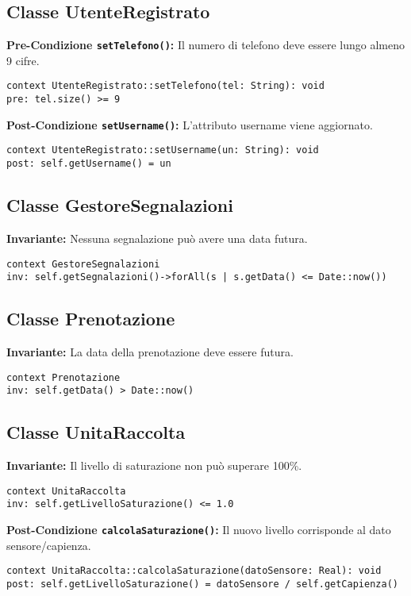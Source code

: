 \subsection{Classe UtenteRegistrato}

\textbf{Pre-Condizione \texttt{setTelefono()}:} Il numero di telefono deve essere lungo almeno 9 cifre.
\begin{lstlisting}[language=OCL]
context UtenteRegistrato::setTelefono(tel: String): void
pre: tel.size() >= 9
\end{lstlisting}

\textbf{Post-Condizione \texttt{setUsername()}:} L’attributo username viene aggiornato.
\begin{lstlisting}[language=OCL]
context UtenteRegistrato::setUsername(un: String): void
post: self.getUsername() = un
\end{lstlisting}

\subsection{Classe GestoreSegnalazioni}

\textbf{Invariante:} Nessuna segnalazione può avere una data futura.
\begin{lstlisting}[language=OCL]
context GestoreSegnalazioni
inv: self.getSegnalazioni()->forAll(s | s.getData() <= Date::now())
\end{lstlisting}

\subsection{Classe Prenotazione}

\textbf{Invariante:} La data della prenotazione deve essere futura.
\begin{lstlisting}[language=OCL]
context Prenotazione
inv: self.getData() > Date::now()
\end{lstlisting}


\subsection{Classe UnitaRaccolta}

\textbf{Invariante:} Il livello di saturazione non può superare 100\%.
\begin{lstlisting}[language=OCL]
context UnitaRaccolta
inv: self.getLivelloSaturazione() <= 1.0
\end{lstlisting}

\textbf{Post-Condizione \texttt{calcolaSaturazione()}:} Il nuovo livello corrisponde al dato sensore/capienza.
\begin{lstlisting}[language=OCL]
context UnitaRaccolta::calcolaSaturazione(datoSensore: Real): void
post: self.getLivelloSaturazione() = datoSensore / self.getCapienza()
\end{lstlisting}

